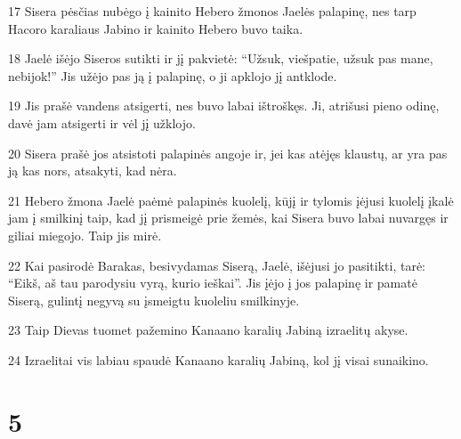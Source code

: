 \par 17 Sisera pėsčias nubėgo į kainito Hebero žmonos Jaelės palapinę, nes tarp Hacoro karaliaus Jabino ir kainito Hebero buvo taika. 
\par 18 Jaelė išėjo Siseros sutikti ir jį pakvietė: “Užsuk, viešpatie, užsuk pas mane, nebijok!” Jis užėjo pas ją į palapinę, o ji apklojo jį antklode. 
\par 19 Jis prašė vandens atsigerti, nes buvo labai ištroškęs. Ji, atrišusi pieno odinę, davė jam atsigerti ir vėl jį užklojo. 
\par 20 Sisera prašė jos atsistoti palapinės angoje ir, jei kas atėjęs klaustų, ar yra pas ją kas nors, atsakyti, kad nėra. 
\par 21 Hebero žmona Jaelė paėmė palapinės kuolelį, kūjį ir tylomis įėjusi kuolelį įkalė jam į smilkinį taip, kad jį prismeigė prie žemės, kai Sisera buvo labai nuvargęs ir giliai miegojo. Taip jis mirė. 
\par 22 Kai pasirodė Barakas, besivydamas Siserą, Jaelė, išėjusi jo pasitikti, tarė: “Eikš, aš tau parodysiu vyrą, kurio ieškai”. Jis įėjo į jos palapinę ir pamatė Siserą, gulintį negyvą su įsmeigtu kuoleliu smilkinyje. 
\par 23 Taip Dievas tuomet pažemino Kanaano karalių Jabiną izraelitų akyse. 
\par 24 Izraelitai vis labiau spaudė Kanaano karalių Jabiną, kol jį visai sunaikino.



\chapter{5}

